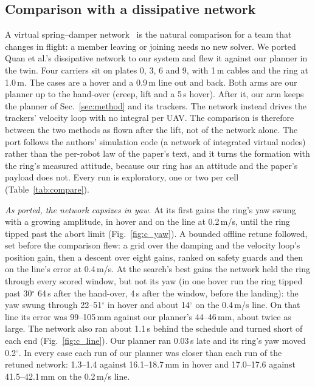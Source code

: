 \subsection{Comparison with a dissipative network}
\label{sec:res_compare}

A virtual spring--damper network~\cite{quan2025swarm} is the natural comparison for a team that changes in flight: a
member leaving or joining needs no new solver. We ported Quan et al.'s dissipative network to our system and flew it
against our planner in the twin. Four carriers sit on plates 0, 3, 6 and 9, with 1\,m cables and the ring at 1.0\,m.
The cases are a hover and a 0.9\,m line out and back. Both arms are our planner up to the hand-over (creep, lift and a
5\,s hover). After it, our arm keeps the planner of Sec.~\ref{sec:method} and its trackers. The network instead drives
the trackers' velocity loop with no integral per UAV. The comparison is therefore between the two methods as flown
after the lift, not of the network alone. The port follows the authors' simulation code (a network of integrated virtual nodes) rather
than the per-robot law of the paper's text, and it turns the formation with the ring's measured attitude, because
our ring has an attitude and the paper's payload does not. Every run is exploratory, one or two per cell
(Table~\ref{tab:compare}).

\emph{As ported, the network capsizes in yaw.} At its first gains the ring's yaw swung with a growing amplitude, in
hover and on the line at 0.2\,m/s, until the ring tipped past the abort limit (Fig.~\ref{fig:c_yaw}). A bounded
offline retune followed, set before the comparison flew: a grid over the damping and the velocity loop's position gain,
then a descent over eight gains, ranked on safety guards and then on the line's error at 0.4\,m/s. At the search's best
gains the network held the ring through every scored window, but not its yaw (in one hover run the ring tipped past
30$^\circ$ 64\,s after the hand-over, 4\,s after the window, before the landing): the yaw swung through 22--51$^\circ$ in hover and about
14$^\circ$ on the 0.4\,m/s line. On that line its error was 99--105\,mm against our planner's 44--46\,mm, about twice as
large. The network also ran about 1.1\,s behind the schedule and turned short of each end (Fig.~\ref{fig:c_line}).
Our planner ran 0.03\,s late and its ring's yaw moved 0.2$^\circ$. In every case each run of our planner was closer
than each run of the retuned network: 1.3--1.4 against 16.1--18.7\,mm in hover and 17.0--17.6 against 41.5--42.1\,mm
on the 0.2\,m/s line.

